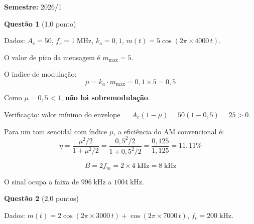 \documentclass[11pt,a4paper]{article}
\begin{document}
\textbf{Semestre:} 2026/1

\textbf{Questão 1} \hfill (1{,}0 ponto)

Dados: $A_c = 50$, $f_c = 1\;\text{MHz}$, $k_a = 0{,}1$, $m(t) = 5\cos(2\pi \times 4000\,t)$.

\begin{resolucao}

O valor de pico da mensagem é $m_{\max} = 5$.

O índice de modulação:
\[
  \mu = k_a \cdot m_{\max} = 0{,}1 \times 5 = \boxed{0{,}5}
\]

Como $\mu = 0{,}5 < 1$, \textbf{não há sobremodulação}.

Verificação: valor mínimo do envelope $= A_c(1 - \mu) = 50(1 - 0{,}5) = 25 > 0$. \checkmark
\end{resolucao}

\begin{resolucao}

Para um tom senoidal com índice $\mu$, a eficiência do AM convencional é:
\[
  \eta = \frac{\mu^2/2}{1 + \mu^2/2} = \frac{0{,}5^2/2}{1 + 0{,}5^2/2} = \frac{0{,}125}{1{,}125} = \boxed{11{,}11\%}
\]
\end{resolucao}

\begin{resolucao}

\[
  B = 2f_m = 2 \times 4\;\text{kHz} = \boxed{8\;\text{kHz}}
\]

O sinal ocupa a faixa de $996\;\text{kHz}$ a $1004\;\text{kHz}$.
\end{resolucao}


\textbf{Questão 2} \hfill (2{,}0 pontos)

Dados: $m(t) = 2\cos(2\pi \times 3000\,t) + \cos(2\pi \times 7000\,t)$, $f_c = 200\;\text{kHz}$.
\end{document}
